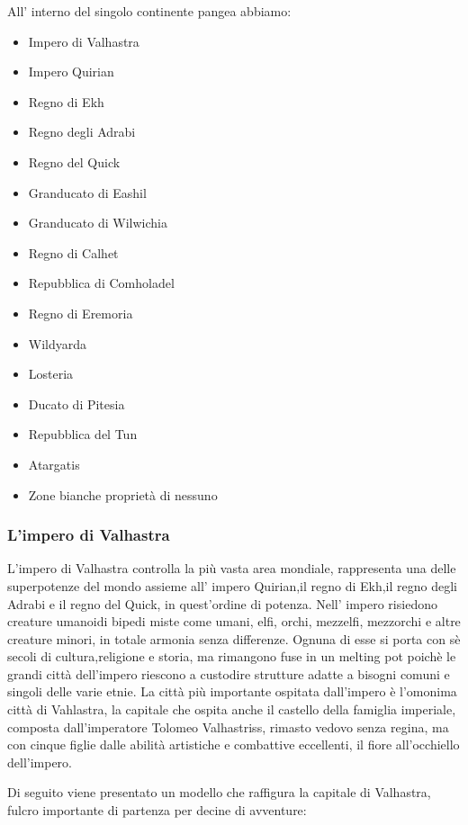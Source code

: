 \documentclass[a4paper,12pt]{book}
\begin{document}
All' interno del singolo continente pangea abbiamo:

\begin{itemize}

\item{Impero di Valhastra}
\item{Impero Quirian}
\item{Regno di Ekh}
\item{Regno degli Adrabi}
\item{Regno del Quick}
\item{Granducato di Eashil}
\item{Granducato di Wilwichia}
\item{Regno di Calhet}
\item{Repubblica di Comholadel}
\item{Regno di Eremoria}
\item{Wildyarda}
\item{Losteria}
\item{Ducato di Pitesia}
\item{Repubblica del Tun}
\item{Atargatis}
\item{Zone bianche proprietà di nessuno}

\end{itemize}

\subsubsection{L'impero di Valhastra}

L'impero di Valhastra controlla la più vasta area mondiale, rappresenta una delle superpotenze del mondo assieme all' impero Quirian,il regno di Ekh,il regno degli Adrabi e il regno del Quick, in quest'ordine di potenza.
Nell' impero risiedono creature umanoidi bipedi miste come umani, elfi, orchi, mezzelfi, mezzorchi e altre creature minori, in totale armonia senza differenze.
Ognuna di esse si porta con sè secoli di cultura,religione e storia, ma rimangono fuse in un melting pot poichè le grandi città dell'impero riescono a custodire strutture adatte a bisogni comuni e singoli delle varie etnie.
La città più importante ospitata dall'impero è l'omonima città di Vahlastra, la capitale che ospita anche il castello della famiglia imperiale, composta dall'imperatore Tolomeo Valhastriss, rimasto vedovo senza regina, ma con cinque figlie dalle abilità artistiche e combattive eccellenti, il fiore all'occhiello dell'impero.

Di seguito viene presentato un modello che raffigura la capitale di Valhastra, fulcro importante di partenza per decine di avventure:
\end{document}
